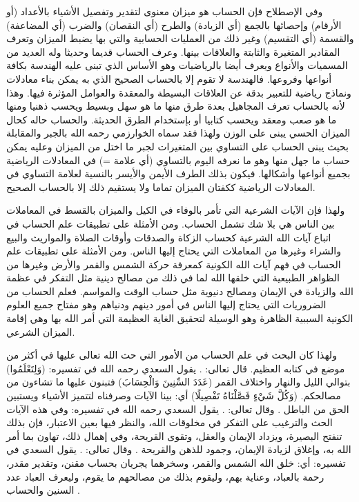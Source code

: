 وفي الإصطلاح فإن الحساب هو ميزان معنوى لتقدير وتفصيل الأشياء بالأعداد (أو الأرقام) وإحصائها بالجمع (أي الزيادة) والطرح (أي النقصان) والضرب (أي المضاعفة) والقسمة (أي التقسيم) وغير ذلك من العمليات الحسابية والتي بها يضبط الميزان وتعرف المقادير المتغيرة والثابتة والعلاقات بينها. وعرف الحساب قديما وحديثا وله العديد من المسميات والأنواع ويعرف أيضا بالرياضيات وهو الأساس الذي تبنى عليه الهندسة بكافة أنواعها وفروعها. فالهندسة لا تقوم إلا بالحساب الصحيح الذي به يمكن بناء معادلات ونماذج رياضية للتعبير بدقة عن العلاقات البسيطة والمعقدة والعوامل المؤثرة فيها. وهذا لأنه بالحساب تعرف المجاهيل بعدة طرق منها ما هو سهل وبسيط ويحسب ذهنيا ومنها ما هو صعب ومعقد ويحسب كتابيا أو بإستخدام الطرق الحديثة. والحساب حاله كحال الميزان الحسي يبنى على الوزن ولهذا فقد سماه الخوارزمي رحمه الله بالجبر والمقابلة بحيث يبنى الحساب على التساوي بين المتغيرات لجبر ما اختل من الميزان وعليه يمكن حساب ما جهل منها وهو ما نعرفه اليوم بالتساوي (أي علامة =) في المعادلات الرياضية بجميع أنواعها وأشكالها. فيكون بذلك الطرف الأيمن والأيسر بالنسية لعلامة التساوي في المعادلات الرياضية ككفتان الميزان تماما ولا يستقيم ذلك إلا بالحساب الصحيح. 

ولهذا فإن الآيات الشرعية التي تأمر بالوفاء في الكيل والميزان بالقسط في المعاملات بين الناس هي بلا شك تشمل الحساب. ومن الأمثلة على تطبيقات علم الحساب في اتباع آيات الله الشرعية كحساب الزكاة والصدقات وأوقات الصلاة والمواريث والبيع والشراء وغيرها من المعاملات التي يحتاج إليها الناس.  ومن الأمثلة على تطبيقات علم الحساب في فهم آيات الله الكونية كمعرفة حركة الشمس والقمر والأرض وغيرها من الظواهر الطبيعية التي خلقها الله لما في ذلك من مصالح دينية مثل التفكر في عظمة الله والزيادة في الإيمان ومصالح دنيوية مثل حساب الوقت والمواسم. فعلم الحساب من الضروريات التي يحتاج إليها الناس في أمور دينهم ودنياهم وهو مفتاح جميع العلوم الكونية السببية الظاهرة وهو الوسيلة لتحقيق الغاية العظيمة التي أمر الله بها وهي إقامة الميزان الشرعي. 

ولهذا كان البحث في علم الحساب من الأمور التي حث الله تعالى عليها في أكثر من موضع في كتابه العظيم. قال تعالى: \quranayah*[17][12]{\footnotesize \surahname*[17]}. يقول السعدي رحمه الله في تفسيره: (وَلِتَعْلَمُوا) بتوالي الليل والنهار واختلاف القمر (عَدَدَ السِّنِينَ وَالْحِسَابَ) فتبنون عليها ما تشاءون من مصالحكم. (وَكُلَّ شَيْءٍ فَصَّلْنَاهُ تَفْصِيلًا) أي: بينا الآيات وصرفناه لتتميز الأشياء ويستبين الحق من الباطل \href{https://shamela.ws/book/42/1001#p1}{\faExternalLink} \cite{tafsir_Saadi}. وقال تعالى: \quranayah*[10][5]{\footnotesize \surahname*[10]}. يقول السعدي رحمه الله في تفسيره: وفي هذه الآيات الحث والترغيب على التفكر في مخلوقات الله، والنظر فيها بعين الاعتبار، فإن بذلك تنفتح البصيرة، ويزداد الإيمان والعقل، وتقوى القريحة، وفي إهمال ذلك، تهاون بما أمر الله به، وإغلاق لزيادة الإيمان، وجمود للذهن والقريحة \href{https://shamela.ws/book/42/729#p6}{\faExternalLink} \cite{tafsir_Saadi}. وقال تعالى: \quranayah*[55][5]{\footnotesize \surahname*[55]}. يقول السعدي في تفسيره: أي: خلق الله الشمس والقمر، وسخرهما يجريان بحساب مقنن، وتقدير مقدر، رحمة بالعباد، وعناية بهم، وليقوم بذلك من مصالحهم ما يقوم، وليعرف العباد عدد السنين والحساب \href{https://shamela.ws/book/42/1887#p6}{\faExternalLink} \cite{tafsir_Saadi}.

